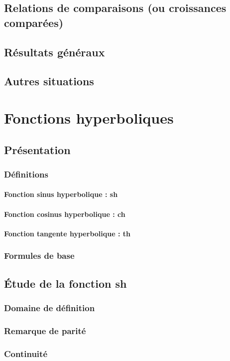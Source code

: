 \documentclass[12pt,a4paper,french]{book}
\begin{document}
	\section{Relations de comparaisons  (ou croissances comparées)}
		\section{Résultats généraux}
		\section{Autres situations}
\chapter{Fonctions hyperboliques}
	\section{Présentation}
		\subsection{Définitions}
			\subsubsection{Fonction sinus hyperbolique : sh}
			\subsubsection{Fonction cosinus hyperbolique : ch}
			\subsubsection{Fonction tangente hyperbolique : th}
		\subsection{Formules de base}
	\section{Étude de la fonction sh}
		\subsection{Domaine de définition}
		\subsection{Remarque de parité}
		\subsection{Continuité}
\end{document}
